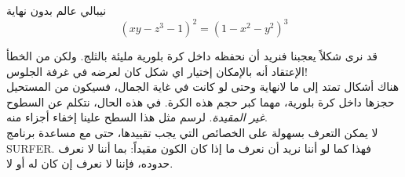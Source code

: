 \begin{surferPage}[نيبالي]{نيبالي}
عالم بدون نهاية \\

\smallskip
\[(x y - z^3 -1)^2= (1 - x^2 - y^2)^3\]

\singlespacing
قد نرى شكلاً يعجبنا فنريد أن نحفظه داخل كرة بلورية مليئة بالثلج. ولكن من الخطأ الإعتقاد أنه بالإمكان إختيار اي شكل كان لعرضه في غرفة الجلوس!
\\
\singlespacing
هناك أشكال تمتد إلى ما لانهاية وحتى لو كانت في غاية الجمال، فسيكون من المستحيل حجزها داخل كرة بلورية، مهما كبر حجم هذه الكرة. في هذه الحال، نتكلم عن السطوح \textit{غير المقيدة}. لرسم مثل هذا السطح علينا إخفاء أجزاء منه.
\\
\singlespacing
لا يمكن التعرف بسهولة على الخصائص التي يجب تقييدها، حتى مع مساعدة برنامج \textenglish{SURFER}. فهذا كما لو أننا نريد أن نعرف ما إذا كان الكون مقيداً: بما أننا لا نعرف حدوده، فإننا لا نعرف إن كان له أو لا.
\end{surferPage}
